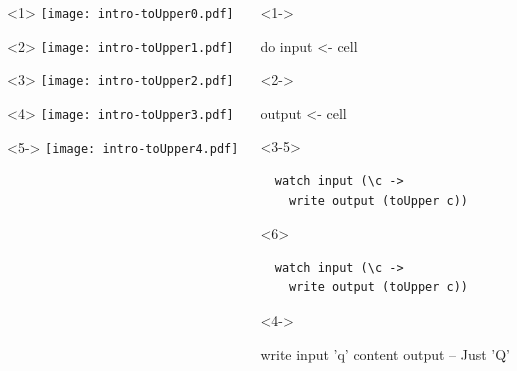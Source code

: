 \documentclass[UKenglish,usenames,dvipsnames,svgnames,table,aspectratio=169,mathserif]{beamer}
\newcommand{\nl}{\vspace{\baselineskip}}
\begin{document}
\begin{frame}[fragile]
\centering

\begin{columns}
\begin{column}{0.5\textwidth}
\begin{overlayarea}{0.5\textwidth}{0.4\textheight}
\begin{onlyenv}<1>
\texttt{[image: intro-toUpper0.pdf]}
\end{onlyenv}
\begin{onlyenv}<2>
\texttt{[image: intro-toUpper1.pdf]}
\end{onlyenv}
\begin{onlyenv}<3>
\texttt{[image: intro-toUpper2.pdf]}
\end{onlyenv}
\begin{onlyenv}<4>
\texttt{[image: intro-toUpper3.pdf]}
\end{onlyenv}
\begin{onlyenv}<5->
\texttt{[image: intro-toUpper4.pdf]}
\end{onlyenv}
\end{overlayarea}
\end{column}
\begin{column}{0.5\textwidth}
\begin{overlayarea}{\textwidth}{0.5\textheight}
\begin{onlyenv}<1->
\begin{haskellcode}
do
  input  <- cell
\end{haskellcode}
\end{onlyenv}
\begin{onlyenv}<2->
\begin{haskellcode}
  output <- cell
\end{haskellcode}
\end{onlyenv}
\begin{onlyenv}<3-5>
\begin{verbatim}
  watch input (\c ->
    write output (toUpper c))
\end{verbatim}
\end{onlyenv}
\begin{onlyenv}<6>
\begin{verbatim}
  watch input (\c ->
    write output (toUpper c))
\end{verbatim}
\end{onlyenv}

\nl
\begin{onlyenv}<4->
\begin{haskellcode}
  write input 'q'
  content output   -- Just 'Q'
\end{haskellcode}
\end{onlyenv}
\end{overlayarea}
\end{column}
\end{columns}
\end{frame}
\end{document}
